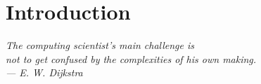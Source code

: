 \chapter{Introduction}\label{ch:intro}
\begin{flushright}{\slshape
    The computing scientist’s main challenge is\\
    not to get confused by the complexities of his own making.\\ \medskip
    --- E. W. Dijkstra
}
\end{flushright}




